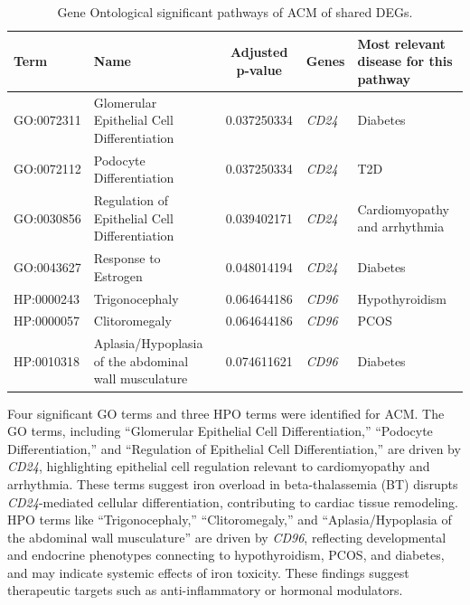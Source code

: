 \begin{table}[H]
\centering
\caption{Gene Ontological significant pathways of ACM of shared DEGs.}
\small
\renewcommand{\arraystretch}{1.1}
\begin{tabularx}{\textwidth}{|l|X|c|X|X|}
\hline
\textbf{Term} & \textbf{Name} & \textbf{Adjusted p-value} & \textbf{Genes} & \textbf{Most relevant disease for this pathway} \\
\hline
GO:0072311 & Glomerular Epithelial Cell Differentiation & 0.037250334 & \textit{CD24} & Diabetes \\
\hline
GO:0072112 & Podocyte Differentiation & 0.037250334 & \textit{CD24} & T2D \\
\hline
GO:0030856 & Regulation of Epithelial Cell Differentiation & 0.039402171 & \textit{CD24} & Cardiomyopathy and arrhythmia \\
\hline
GO:0043627 & Response to Estrogen & 0.048014194 & \textit{CD24} & Diabetes \\
\hline
HP:0000243 & Trigonocephaly & 0.064644186 & \textit{CD96} & Hypothyroidism \\
\hline
HP:0000057 & Clitoromegaly & 0.064644186 & \textit{CD96} & PCOS \\
\hline
HP:0010318 & Aplasia/Hypoplasia of the abdominal wall musculature & 0.074611621 & \textit{CD96} & Diabetes \\
\hline
\end{tabularx}
\end{table}

Four significant GO terms and three HPO terms were identified for ACM. The GO terms, including ``Glomerular Epithelial Cell Differentiation,'' ``Podocyte Differentiation,'' and ``Regulation of Epithelial Cell Differentiation,'' are driven by \textit{CD24}, highlighting epithelial cell regulation relevant to cardiomyopathy and arrhythmia. These terms suggest iron overload in beta-thalassemia (BT) disrupts \textit{CD24}-mediated cellular differentiation, contributing to cardiac tissue remodeling. HPO terms like ``Trigonocephaly,'' ``Clitoromegaly,'' and ``Aplasia/Hypoplasia of the abdominal wall musculature'' are driven by \textit{CD96}, reflecting developmental and endocrine phenotypes connecting to hypothyroidism, PCOS, and diabetes, and may indicate systemic effects of iron toxicity. These findings suggest therapeutic targets such as anti-inflammatory or hormonal modulators. \\



